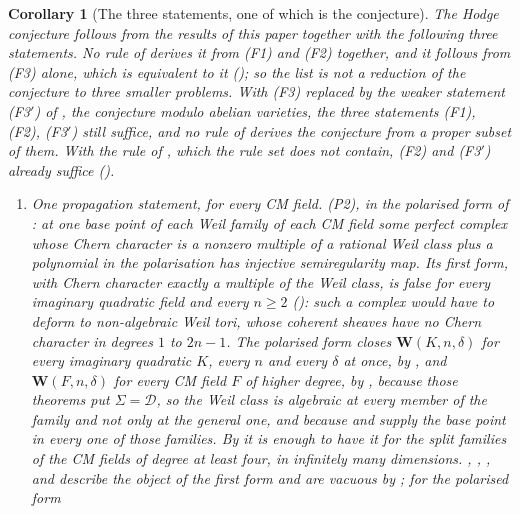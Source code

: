 \documentclass[11pt,reqno]{amsart}
\theoremstyle{plain}
\newtheorem{corollary}[theorem]{Corollary}
\theoremstyle{definition}
\theoremstyle{remark}
\newcommand{\cD}{\mathcal{D}}
\begin{document}
\begin{corollary}[The three statements, one of which is the
conjecture]\label{cor:fourremain}
The Hodge conjecture follows from the results of this paper together with the
following three statements. No rule of  derives it from
(F1) and (F2) together, and it follows from (F3) alone, which is equivalent
to it
(); so the list is not a reduction of the conjecture to
three smaller problems. With (F3) replaced by the weaker statement
\textup{(F3$'$)} of , the conjecture modulo abelian
varieties, the three statements (F1), (F2), \textup{(F3$'$)} still suffice,
and no rule of  derives the conjecture from a proper
subset of them. With the rule of , which the rule set does
not contain, (F2) and \textup{(F3$'$)} already suffice ().
\begin{enumerate}[label=\textup{(F\arabic*)},leftmargin=3.0em,itemsep=4pt]
\item \emph{One propagation statement, for every CM field.} \textup{(P2)},
  in the polarised form of \cite[Remark~3.6]{paperII}: at one base point of each
  Weil family of each CM field some perfect complex whose Chern character is
  a nonzero multiple of a rational Weil class plus a polynomial in the
  polarisation has injective semiregularity map. Its first form, with Chern
  character exactly a multiple of the Weil class, is false for every
  imaginary quadratic field and every $n\ge2$ (\cite[Theorem~3.5]{paperII}): such a
  complex would have to deform to non-algebraic Weil tori, whose coherent
  sheaves have no Chern character in degrees $1$ to $2n-1$. The polarised form
  closes
  $\mathbf{W}(K,n,\delta)$
  for every imaginary quadratic $K$, every $n$ and every $\delta$ at once, by
  \cite[Theorem~2.3]{paperII}, and
  $\mathbf{W}(F,n,\delta)$ for every CM field $F$ of higher degree, by
  \cite[Theorem~17.7]{paperI}, because those theorems put $\Sigma=\cD$, so the
  Weil class is algebraic at every member of the family and not only at the
  general one, and because \cite[Theorem~15.27]{paperI} and \cite[Theorem~17.5]{paperI}
  supply the base point in every one of those families. By
   it is enough to have it for the split families of the
  CM fields of degree at least four, in infinitely many dimensions.
  \cite[Theorem~2.5]{paperII}, \cite[Theorem~2.13]{paperII}, ,
  \cite[Theorem~2.11]{paperII} and \cite[Theorem~2.14]{paperII} describe the object of the
  first form and are vacuous by \cite[Theorem~3.5]{paperII}; for the polarised form

\end{enumerate}
\end{corollary}
\end{document}
